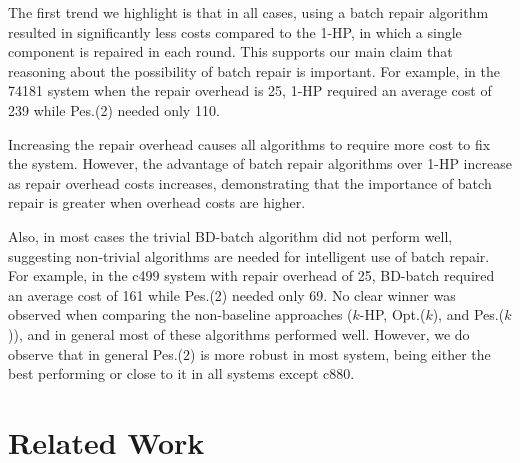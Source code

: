 \documentclass[review]{elsarticle}
\newcommand{\planbased}{{\tt Plan-based-BRP}}
\begin{document}


The first trend we highlight is that in all cases, using a batch repair algorithm resulted in significantly less costs compared to the 1-HP, in which a single component is repaired in each round. This supports our main claim that reasoning about the possibility of batch repair is important. For example, in the 74181 system when the repair overhead is 25, 1-HP required an average cost of 239 while Pes.(2) needed only 110.  


Increasing the repair overhead causes all algorithms to require more cost to fix the system. However, the advantage of batch repair algorithms over 1-HP increase as repair overhead costs increases, demonstrating that the importance of batch repair is greater when overhead costs are higher. 

Also, in most cases the trivial BD-batch algorithm did not perform well, suggesting non-trivial algorithms are needed for intelligent use of batch repair. For example, in the c499 system with repair overhead of 25, BD-batch required an average cost of 161 while Pes.(2) needed only 69. No clear winner was observed when comparing the non-baseline approaches ($k$-HP, Opt.($k$), and Pes.($k$)), and in general most of these algorithms performed well. 
However, we do observe that in general Pes.($2$) is more robust in most system, being either the best performing or close to it in all systems except c880. 


\section{Related Work}
\label{sec:relatedWork}	
\end{document}
